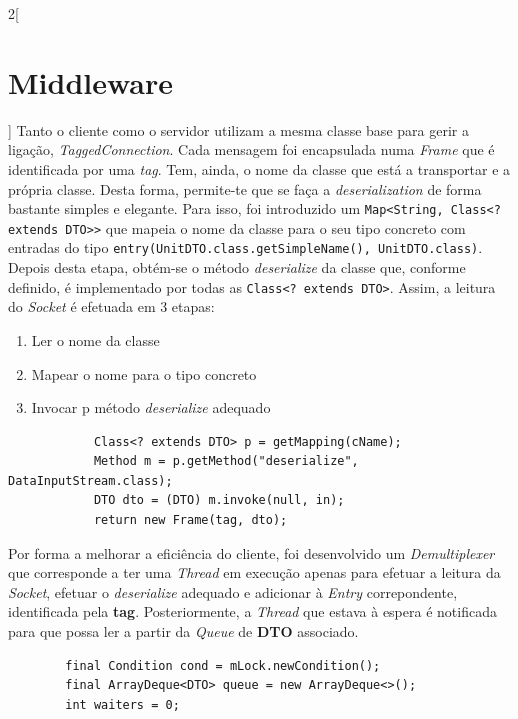\documentclass[a4paper,11pt]{scrreprt}
\begin{document}
\begin{multicols}{2}[\section{Middleware}]
    Tanto o cliente como o servidor utilizam a mesma classe base para 
    gerir a ligação, \textit{TaggedConnection}.
    Cada mensagem foi encapsulada numa \textit{Frame}
    que é identificada por uma \textit{tag}.
    Tem, ainda, o nome da classe que está a transportar e
    a própria classe.
    Desta forma, permite-te que se faça a \textit{deserialization}
    de forma bastante simples e elegante.
    Para isso, foi introduzido um \texttt{Map<String, Class<? extends DTO>>}
    que mapeia o nome da classe para o seu tipo concreto com entradas do tipo
    \texttt{entry(UnitDTO.class.getSimpleName(), UnitDTO.class)}.
    Depois desta etapa, obtém-se o método \textit{deserialize} da classe que,
    conforme definido, é implementado por todas as 
    \texttt{Class<? extends DTO>}.
    Assim, a leitura do \textit{Socket} é efetuada em 3 etapas:
    \begin{enumerate}
        \item Ler o nome da classe
        \item Mapear o nome para o tipo concreto
        \item Invocar p método \textit{deserialize} adequado
    \end{enumerate}
    \begin{verbatim}
            Class<? extends DTO> p = getMapping(cName);
            Method m = p.getMethod("deserialize", DataInputStream.class);
            DTO dto = (DTO) m.invoke(null, in);
            return new Frame(tag, dto);
    \end{verbatim}
    Por forma a melhorar a eficiência do cliente, foi desenvolvido
    um \textit{Demultiplexer} que corresponde a ter uma \textit{Thread}
    em execução apenas para efetuar a leitura da \textit{Socket}, 
    efetuar o \textit{deserialize} adequado e adicionar à \textit{Entry}
    correpondente, identificada pela \textbf{tag}.
    Posteriormente, a \textit{Thread} que estava à espera é notificada para
    que possa ler a partir da \textit{Queue} de \textbf{DTO} associado.
    \begin{verbatim}
        final Condition cond = mLock.newCondition();
        final ArrayDeque<DTO> queue = new ArrayDeque<>();
        int waiters = 0;
    \end{verbatim}
    

\end{multicols}
\end{document}
